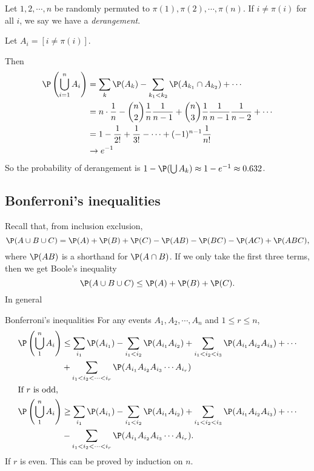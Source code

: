 \documentclass[a4paper]{article}
\begin{document}
\begin{eg}
  Let $1, 2, \cdots, n$ be randomly permuted to $\pi(1), \pi(2), \cdots, \pi(n)$. If 
  $i \not= \pi(i)$ for all $i$, we say we have a \emph{derangement}.

  Let $A_i = [i \not= \pi(i)]$.

  Then
  \begin{align*}
    \P\left(\bigcup _{i = 1}^n A_i\right) &= \sum_{k} \P(A_k) - \sum_{k_1 < k_2} \P(A_{k_1} \cap A_{k_2}) + \cdots\\
    &= n\cdot \frac{1}{n} - \binom{n}{2}\frac{1}{n}\frac{1}{n - 1} + \binom{n}{3}\frac{1}{n}\frac{1}{n - 1}\frac{1}{n - 2} + \cdots\\
    &= 1 - \frac{1}{2!} + \frac{1}{3!} - \cdots + (-1)^{n - 1}\frac{1}{n!}\\
    &\to e^{-1}
  \end{align*}
  So the probability of derangement is $1 - \P(\bigcup A_k) \approx 1 - e^{-1}\approx 0.632$.
\end{eg}

\subsection{Bonferroni's inequalities}
Recall that, from inclusion exclusion,
\[
  \P(A\cup B\cup C) = \P(A) + \P(B) + \P(C) - \P(AB) - \P(BC) - \P(AC) + \P(ABC),
\]
where $\P(AB)$ is a shorthand for $\P(A\cap B)$. If we only take the first three terms, then we get Boole's inequality
\[
  \P(A\cup B\cup C) \leq \P(A) + \P(B) + \P(C).
\]
In general
\begin{thm}{Bonferroni's inequalities}
For any events $A_1, A_2, \cdots, A_n$ and $1 \leq r\leq n$,
\begin{align*}
  \P\left(\bigcup_{1}^n A_i\right) &\leq \sum_{i_1} \P(A_{i_1}) - \sum_{i_1 < i_2} \P(A_{i_1}A_{i_2}) + \sum_{i_1 < i_2 < i_3} \P(A_{i_1}A_{i_2}A_{i_3}) + \cdots\\
  &+ \sum_{i_1 < i_2 < \cdots < i_r} \P(A_{i_1}A_{i_2}A_{i_3}\cdots A_{i_r})\\
  \intertext{If $r$ is odd,}
  \P\left(\bigcup_{1}^n A_i\right) &\geq \sum_{i_1} \P(A_{i_1}) - \sum_{i_1 < i_2} \P(A_{i_1}A_{i_2}) + \sum_{i_1 < i_2 < i_3} \P(A_{i_1}A_{i_2}A_{i_3}) + \cdots\\
  &- \sum_{i_1 < i_2 < \cdots < i_r} \P(A_{i_1}A_{i_2}A_{i_3}\cdots A_{i_r}).
\end{align*}
If $r$ is even. This can be proved by induction on $n$. 
\end{thm}
\end{document}
